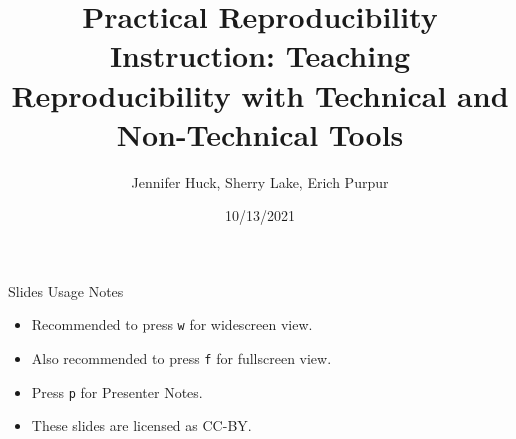 \documentclass[
  ignorenonframetext,
]{beamer}
\title{Practical Reproducibility Instruction: Teaching Reproducibility
with Technical and Non-Technical Tools}
\author{Jennifer Huck, Sherry Lake, Erich Purpur}
\date{10/13/2021}
\providecommand{\tightlist}{%
  \setlength{\itemsep}{0pt}\setlength{\parskip}{0pt}}
\begin{document}
\frame{\titlepage}

\begin{frame}
\end{frame}

\begin{frame}[fragile]{Slides Usage Notes}
\protect\hypertarget{slides-usage-notes}{}
\begin{itemize}
\tightlist
\item
  Recommended to press \texttt{w} for widescreen view.
\item
  Also recommended to press \texttt{f} for fullscreen view.
\item
  Press \texttt{p} for Presenter Notes.
\item
  These slides are licensed as CC-BY.
\end{itemize}

\end{frame}
\end{document}
